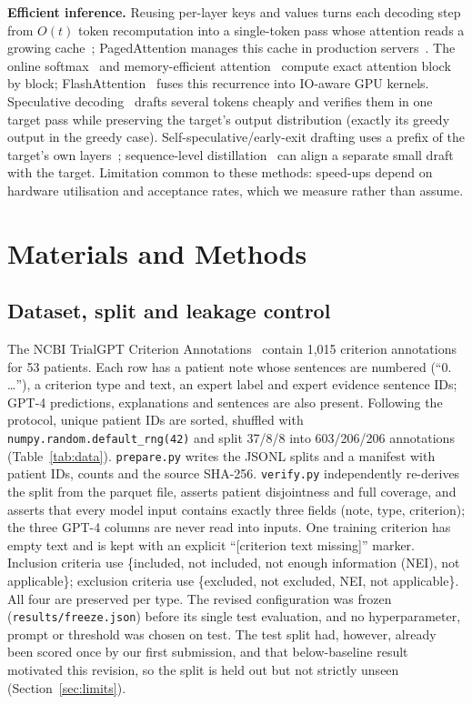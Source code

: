 \textbf{Efficient inference.} Reusing per-layer keys and values turns each decoding step from $O(t)$ token recomputation into a single-token pass whose attention reads a growing cache~\cite{pope}; PagedAttention manages this cache in production servers~\cite{paged}. The online softmax~\cite{online} and memory-efficient attention~\cite{rabe} compute exact attention block by block; FlashAttention~\cite{flash,flash2} fuses this recurrence into IO-aware GPU kernels. Speculative decoding~\cite{spec,chen} drafts several tokens cheaply and verifies them in one target pass while preserving the target's output distribution (exactly its greedy output in the greedy case). Self-speculative/early-exit drafting uses a prefix of the target's own layers~\cite{layerskip,drafverify}; sequence-level distillation~\cite{seqkd} can align a separate small draft with the target. Limitation common to these methods: speed-ups depend on hardware utilisation and acceptance rates, which we measure rather than assume.

\section{Materials and Methods}
\subsection{Dataset, split and leakage control}
The NCBI TrialGPT Criterion Annotations~\cite{data} contain 1,015 criterion annotations for 53 patients. Each row has a patient note whose sentences are numbered (``0. \ldots''), a criterion type and text, an expert label and expert evidence sentence IDs; GPT-4 predictions, explanations and sentences are also present. Following the protocol, unique patient IDs are sorted, shuffled with \texttt{numpy.random.default\_rng(42)} and split 37/8/8 into 603/206/206 annotations (Table~\ref{tab:data}). \texttt{prepare.py} writes the JSONL splits and a manifest with patient IDs, counts and the source SHA-256. \texttt{verify.py} independently re-derives the split from the parquet file, asserts patient disjointness and full coverage, and asserts that every model input contains exactly three fields (note, type, criterion); the three GPT-4 columns are never read into inputs. One training criterion has empty text and is kept with an explicit ``[criterion text missing]'' marker. Inclusion criteria use \{included, not included, not enough information (NEI), not applicable\}; exclusion criteria use \{excluded, not excluded, NEI, not applicable\}. All four are preserved per type. The revised configuration was frozen (\texttt{results/freeze.json}) before its single test evaluation, and no hyperparameter, prompt or threshold was chosen on test. The test split had, however, already been scored once by our first submission, and that below-baseline result motivated this revision, so the split is held out but not strictly unseen (Section~\ref{sec:limits}).

